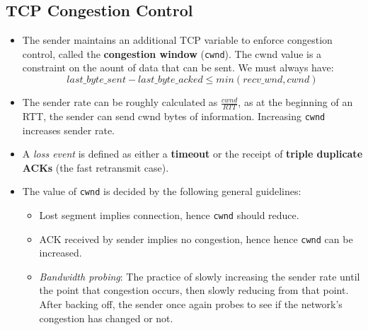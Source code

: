 \documentclass{article}
\theoremstyle{plain}
\theoremstyle{definition}
\begin{document}
\subsection{TCP Congestion Control}
\begin{itemize}
    \item The sender maintains an additional TCP variable to enforce congestion control, called the \textbf{congestion window} (\texttt{cwnd}). The cwnd value is a constraint on the aount of data that can be sent. We must always have:
    \begin{equation*}
        last\_byte\_sent - last\_byte\_acked \le min(recv\_wnd, cwnd)
    \end{equation*}
    
    \item The sender rate can be roughly calculated as $\frac{cwnd}{RTT}$, as at the beginning of an RTT, the sender can send cwnd bytes of information. Increasing \texttt{cwnd} increases sender rate. 
    
    \item A \textit{loss event} is defined as either a \textbf{timeout} or the receipt of \textbf{triple duplicate ACKs} (the fast retransmit case). 
    
    \item The value of \texttt{cwnd} is decided by the following general guidelines:
    \begin{itemize}
        \item Lost segment implies connection, hence \texttt{cwnd} should reduce. 
        
        \item ACK received by sender implies no congestion, hence hence \texttt{cwnd} can be increased.
        
        \item \textit{Bandwidth probing}: The practice of slowly increasing the sender rate until the point that congestion occurs, then slowly reducing from that point. After backing off, the sender once again probes to see if the network's congestion has changed or not. 
    \end{itemize}
\end{itemize}
\end{document}
